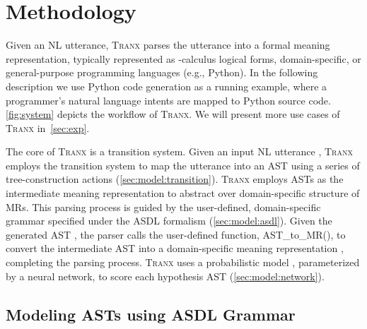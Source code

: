 \documentclass[11pt,a4paper]{article}
\renewcommand{\tt}[1]{\fontfamily{cmtt}\selectfont #1}
\def\model/{\textsc{Tranx}}
\begin{document}
\section{Methodology}

Given an NL utterance, \model/ parses the utterance into a formal meaning representation, typically represented as -calculus logical forms, domain-specific, or general-purpose programming languages (e.g., Python).
In the following description we use Python code generation as a running example, where a programmer's natural language intents are mapped to Python source code. 
\autoref{fig:system} depicts the workflow of \model/.
We will present more use cases of \model/ in~\autoref{sec:exp}. 

The core of \model/ is a transition system.
Given an input NL utterance , \model/ employs the transition system to map the utterance  into an AST  using a series of tree-construction actions (\autoref{sec:model:transition}).
\model/ employs ASTs as the intermediate meaning representation to abstract over domain-specific structure of MRs.
This parsing process is guided by the user-defined, domain-specific grammar specified under the ASDL formalism (\autoref{sec:model:asdl}).
Given the generated AST , the parser calls the user-defined function, {\tt AST\_to\_MR()}, to convert the intermediate AST into a domain-specific meaning representation , completing the parsing process. 
\model/ uses a probabilistic model , parameterized by a neural network, to score each hypothesis AST (\autoref{sec:model:network}). 







\subsection{Modeling ASTs using ASDL Grammar}
\label{sec:model:asdl}
\end{document}
